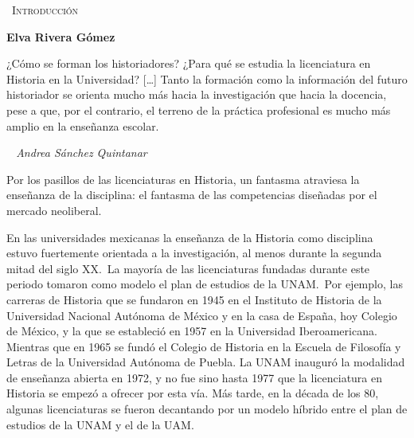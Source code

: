 \clearpage\setcounter{page}{1}
\thispagestyle{empty}
{\centering \large {\scshape\ Introducción}\par}
\setcounter{footnote}{0}

\bigskip
\begin{center}
{\bfseries Elva Rivera Gómez\par}
\end{center}

\bigskip
\epigraph{¿Cómo se forman los historiadores? ¿Para qué se estudia la licenciatura en 
Historia en la Universidad? [\ldots] Tanto la formación como la información
del futuro historiador se orienta mucho más hacia la investigación 
que hacia la docencia, pese a que, por el contrario, 
el terreno de la práctica profesional es mucho 
más amplio en la enseñanza escolar.}{\itshape\ \textemdash{} Andrea Sánchez Quintanar\/}
\enlargethispage{2\baselineskip}

\bigskip
Por los pasillos de las licenciaturas en Historia, un fantasma atraviesa la enseñanza de la disciplina: 
 el fantasma de las competencias diseñadas por el mercado neoliberal. 

En las universidades mexicanas la enseñanza de la Historia como disciplina estuvo fuertemente orientada a la investigación, al menos durante la segunda mitad del siglo XX.\ La mayoría de las licenciaturas fundadas durante este periodo tomaron como
modelo el plan de estudios de la UNAM.\ Por ejemplo, las carreras de Historia
que se fundaron en 1945 en el Instituto de Historia de la Universidad Nacional Autónoma de México y en la casa de España, hoy Colegio de México, y la que se estableció en 1957 en la Universidad Iberoamericana. Mientras que en 1965 se fundó el Colegio de Historia en la Escuela de Filosofía y Letras de la Universidad Autónoma de Puebla. La UNAM inauguró la modalidad de enseñanza abierta en 1972, y  no fue sino hasta 1977 que la licenciatura en Historia se empezó a ofrecer por esta vía. Más tarde, en la década de los $80$,
algunas licenciaturas se fueron decantando por un modelo híbrido entre el plan de estudios de la UNAM y el de la UAM\@.

